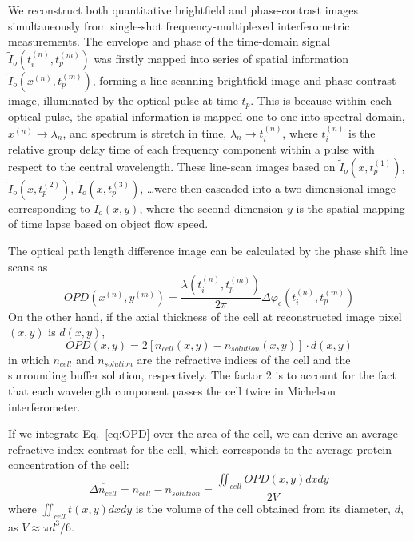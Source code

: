 \documentclass[aps,pra,reprint,longbibliography,superscriptaddress]{revtex4-1}
\begin{document}
We reconstruct both quantitative brightfield and phase-contrast images simultaneously from single-shot frequency-multiplexed interferometric measurements. The envelope and phase of the time-domain signal $\tilde{I}_o (t_i^{(n)}, t_p^{(m)})$ was firstly mapped into series of spatial information $\tilde{I}_o(x^{(n)},t_p^{(m)})$, forming a line scanning brightfield image and phase contrast image, illuminated by the optical pulse at time $t_p$. This is because within each optical pulse, the spatial information is mapped one-to-one into spectral domain, $x^{(n)} \rightarrow \lambda_n$, and spectrum is stretch in time, $\lambda_n \rightarrow t_i^{(n)}$, where $t_i^{(n)}$ is the relative group delay time of each frequency component within a pulse with respect to the central wavelength. These line-scan images based on $\tilde{I}_o(x,t_p^{(1)})$, $\tilde{I}_o (x, t_p^{(2)})$, $\tilde{I}_o(x,t_p^{(3)})$, \ldots were then cascaded into a two dimensional image corresponding to $\tilde{I}_o(x,y)$, where the second dimension $y$ is the spatial mapping of time lapse based on object flow speed. 

The optical path length difference image can be calculated by the phase shift line scans as
\begin{equation}
OPD(x^{(n)},y^{(m)}) = \frac{\lambda(t_i^{(n)},t_p^{(m)})}{2\pi} \Delta\varphi_c(t_i^{(n)},t_p^{(m)})
\end{equation}
On the other hand, if the axial thickness of the cell at reconstructed image pixel $(x,y)$ is $d(x,y)$,
\begin{equation} \label{eq:OPD}
OPD(x,y) = 2 [n_{cell}(x,y) - n_{solution}(x,y)] \cdot d(x,y)
\end{equation}
in which $n_{cell}$ and $n_{solution}$ are the refractive indices of the cell and the surrounding buffer solution, respectively. The factor 2 is to account for the fact that each wavelength component passes the cell twice in Michelson interferometer. 

If we integrate Eq.~\ref{eq:OPD} over the area of the cell, we can derive an average refractive index contrast for the cell, which corresponds to the average protein concentration of the cell:
\begin{equation}
\overline{\Delta n_{cell}} = \overline{n_{cell} - n_{solution}} = \frac{\iint_{cell} OPD(x,y) dx dy}{2 V}
\end{equation}
where $\iint_{cell} t(x,y) dx dy$ is the volume of the cell obtained from its diameter, $d$, as $V \approx \pi d^3/6$. 
\end{document}
